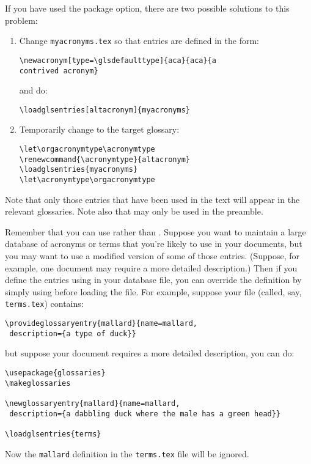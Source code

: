 \documentclass[report,inlinetitle]{nlctdoc}
\begin{document}
If you have used the  package option,
there are two possible solutions to this problem:
\begin{enumerate}
\item Change \texttt{myacronyms.tex} so that entries are defined in
the form:
\begin{verbatim}
\newacronym[type=\glsdefaulttype]{aca}{aca}{a 
contrived acronym}
\end{verbatim}
and do:
\begin{verbatim}
\loadglsentries[altacronym]{myacronyms}
\end{verbatim}

\item Temporarily change  to the target glossary:
\begin{verbatim}
\let\orgacronymtype\acronymtype
\renewcommand{\acronymtype}{altacronym}
\loadglsentries{myacronyms}
\let\acronymtype\orgacronymtype
\end{verbatim}
\end{enumerate}

Note that only those entries that have been used
in the text will appear in the relevant glossaries.
Note also that  may only be used in the 
preamble.

Remember that you can use  rather than
. Suppose you want to maintain a large database
of acronyms or terms that you're likely to use in your documents,
but you may want to use a modified version of some of those entries.
(Suppose, for example, one document may require a more detailed
description.) Then if you define the entries using
 in your database file, you can override
the definition by simply using  before loading
the file. For example, suppose your file (called, say,
\texttt{terms.tex}) contains:
\begin{verbatim}
\provideglossaryentry{mallard}{name=mallard,
 description={a type of duck}}
\end{verbatim}
but suppose your document requires a more detailed description, you
can do:
\begin{verbatim}
\usepackage{glossaries}
\makeglossaries

\newglossaryentry{mallard}{name=mallard,
 description={a dabbling duck where the male has a green head}}

\loadglsentries{terms}
\end{verbatim}
Now the \texttt{mallard} definition in the \texttt{terms.tex} file
will be ignored.
\end{document}
